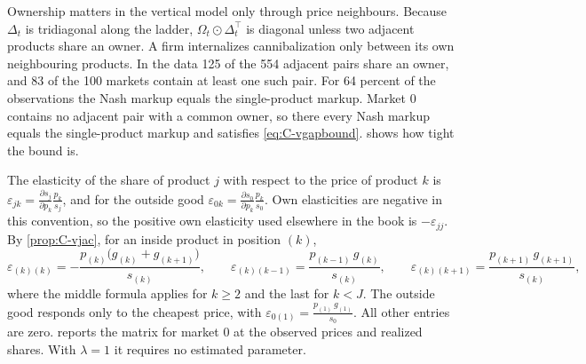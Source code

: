 Ownership matters in the vertical model only through price neighbours. Because $\Delta_t$ is tridiagonal along the
ladder, $\Omega_t \odot \Delta_t^\top$ is diagonal unless two adjacent products share an owner. A firm internalizes
cannibalization only between its own neighbouring products. In the data 125 of the 554 adjacent pairs share an owner,
and 83 of the 100 markets contain at least one such pair. For 64 percent of the observations the Nash markup equals the
single-product markup. Market 0 contains no adjacent pair with a common owner, so there every Nash markup equals the
single-product markup and satisfies \eqref{eq:C-vgapbound}.  shows how tight the bound is.

The elasticity of the share of product $j$ with respect to the price of product $k$ is
$\varepsilon_{jk} = \frac{\partial s_j}{\partial p_k}\frac{p_k}{s_j}$, and for the outside good
$\varepsilon_{0k} = \frac{\partial s_0}{\partial p_k}\frac{p_k}{s_0}$. Own elasticities are negative in this convention,
so the positive own elasticity used elsewhere in the book is $-\varepsilon_{jj}$. By \cref{prop:C-vjac}, for an
inside product in position $(k)$,
\begin{equation}\label{eq:C-velast}
  \varepsilon_{(k)(k)} = -\frac{p_{(k)}\big(g_{(k)} + g_{(k+1)}\big)}{s_{(k)}}, \qquad
  \varepsilon_{(k)(k-1)} = \frac{p_{(k-1)}\,g_{(k)}}{s_{(k)}}, \qquad
  \varepsilon_{(k)(k+1)} = \frac{p_{(k+1)}\,g_{(k+1)}}{s_{(k)}},
\end{equation}
where the middle formula applies for $k \ge 2$ and the last for $k < J$. The outside good responds only to the cheapest
price, with $\varepsilon_{0(1)} = \frac{p_{(1)}\,g_{(1)}}{s_0}$. All other entries are zero.  reports the matrix for market 0 at the observed prices and realized shares. With $\lambda = 1$ it
requires no estimated parameter.

